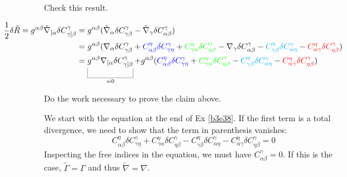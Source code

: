 \documentclass[10pt]{article}
\begin{document}
\begin{example}\label{b3e38}
	Check this result.
\end{example}
\sol $$
\hspace*{-5em}
\begin{aligned}
	\frac12\delta\tilde{R} = g^{\alpha\beta}\tilde{\nabla}_{[\alpha}\delta C_{\gamma]\beta}^\gamma &= g^{\alpha\beta}(\tilde{\nabla}_\alpha\delta C_{\gamma\beta}^\gamma - \tilde{\nabla}_\gamma\delta C_{\alpha\beta}^\gamma)\\
	&= g^{\alpha\beta}(\nabla_\alpha\delta C_{\gamma\beta}^\gamma + {\color{blue} C_{\alpha\beta}^\eta \delta C_{\gamma\eta}^\gamma} + {\color{green} C_{\gamma\alpha}^\eta \delta C_{\eta\beta}^\gamma} - \nabla_\gamma\delta C_{\alpha\beta}^\gamma - {\color{cyan} C_{\gamma\beta}^\eta \delta C_{\alpha\eta}^\gamma} - {\color{red} C_{\alpha\gamma}^\eta \delta C_{\eta\beta}^\gamma})\\
	&= \ub{g^{\alpha\beta}\nabla_{[\alpha}\delta C_{\gamma]\beta}^\gamma}{=0} + g^{\alpha\beta}({\color{blue} C_{\alpha\beta}^\eta \delta C_{\gamma\eta}^\gamma} + {\color{green} C_{\gamma\alpha}^\eta \delta C_{\eta\beta}^\gamma} - {\color{cyan} C_{\gamma\beta}^\eta \delta C_{\alpha\eta}^\gamma} - {\color{red} C_{\alpha\gamma}^\eta \delta C_{\eta\beta}^\gamma})\\
\end{aligned}
$$


\begin{example}\label{b3e39}
	Do the work necessary to prove the claim above.
\end{example}
\sol We start with the equation at the end of Ex \ref{b3e38}. If the first term is a total divergence, we need to show that the term in parenthesis vanishes:
$$
	C_{\alpha\beta}^\eta \delta C_{\gamma\eta}^\gamma + C_{\gamma\alpha}^\eta \delta C_{\eta\beta}^\gamma - C_{\gamma\beta}^\eta \delta C_{\alpha\eta}^\gamma - C_{\alpha\gamma}^\eta \delta C_{\eta\beta}^\gamma = 0
$$
Inspecting the free indices in the equation, we must have $C_{\alpha\beta}^\gamma = 0$. If this is the case, $\tilde{\Gamma} = \Gamma$ and thus $\tilde{\nabla} = \nabla$.
\end{document}
